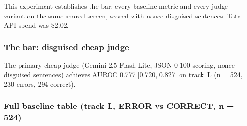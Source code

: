 \documentclass[11pt,letterpaper]{article}
\begin{document}
This experiment establishes the bar: every baseline metric and every judge variant on the same shared screen, scored with nonce-disguised sentences. Total API spend was \$2.02.

\subsubsection{The bar: disguised cheap judge}

The primary cheap judge (Gemini 2.5 Flash Lite, JSON 0-100 scoring, nonce-disguised sentences) achieves AUROC 0.777 [0.720, 0.827] on track~L (n = 524, 230 errors, 294 correct).

\subsubsection{Full baseline table (track L, ERROR vs CORRECT, n = 524)}
\end{document}
